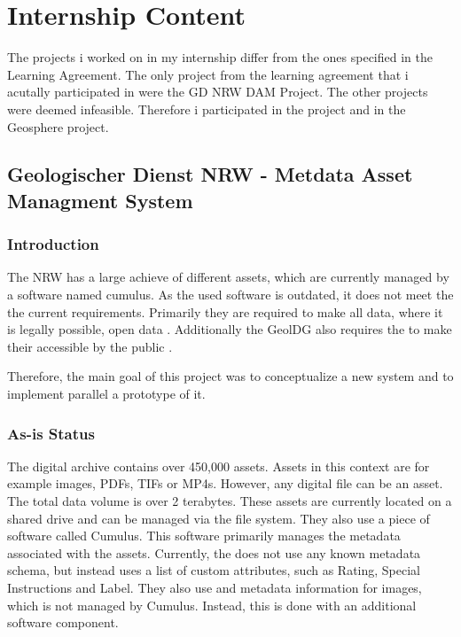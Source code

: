 \documentclass[11pt, titlepage, a4paper]{article}
\begin{document}
\section{Internship Content}
The projects i worked on in my internship differ from the ones specified in the Learning Agreement. The only project from the learning agreement that i acutally participated in were the GD NRW DAM Project. The other projects were deemed infeasible. Therefore i participated in the  project and in the Geosphere project. 

\subsection{Geologischer Dienst NRW - Metdata Asset Managment System}
\subsubsection{Introduction}
The   NRW has a large achieve of different assets, which are currently managed by a software named cumulus. As the used software is outdated, it does not meet the the current requirements.
Primarily they  are required to make all data, where it is legally possible, open data \cite{GesetzZurForderung2017}.
Additionally the GeolDG also requires the  to make their accessible by the public \cite{GesetzZurStaatlichen2020}.

Therefore, the main goal of this project was to conceptualize a new system and to implement parallel a prototype of it.
\subsubsection{As-is Status}
The  digital archive contains over 450,000 assets. Assets in this context are for example images, PDFs, TIFs or MP4s. However, any digital file can be an asset. The total data volume is over 2 terabytes.
These assets are currently located on a shared drive and can be managed via the file system. They also use a piece of software called Cumulus. This software primarily manages the metadata associated with the assets. Currently, the  does not use any known metadata schema, but instead uses a list of custom attributes, such as Rating, Special Instructions and Label.
They also use  and  metadata information for images, which is not managed by Cumulus. Instead, this is done with an additional software component. %
\end{document}
